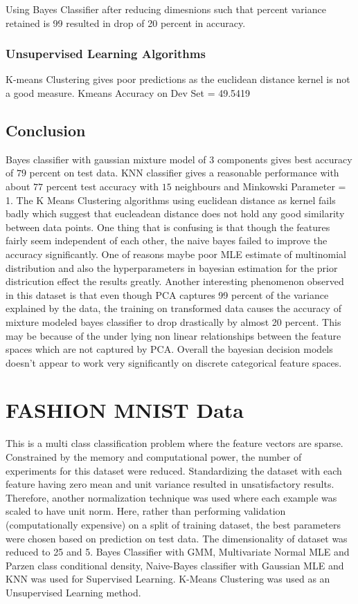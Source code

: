 \documentclass[12pt,journal,compsoc]{IEEEtran}
\begin{document}
\noindent Using Bayes Classifier after reducing dimesnions such that percent variance retained is 99 resulted in drop of 20 percent in accuracy. 

\subsubsection{Unsupervised Learning Algorithms}

\noindent K-means Clustering gives poor predictions as the euclidean distance kernel is not a good measure. Kmeans Accuracy on Dev Set =  49.5419

\pagebreak
\subsection{Conclusion}
\noindent Bayes classifier with gaussian mixture model of 3 components gives best accuracy of  $79$ percent on test data. KNN classifier gives a reasonable performance with about $77$ percent test accuracy with $15$ neighbours and Minkowski Parameter = 1. The K Means Clustering algorithms using euclidean distance as kernel fails badly which suggest that eucleadean distance does not hold any good similarity between data points. One thing that is confusing is that though the features fairly seem independent of each other, the naive bayes failed to improve the accuracy significantly. One of reasons maybe poor MLE estimate of multinomial distribution and also the hyperparameters in bayesian estimation for the prior districution effect the results greatly. Another interesting phenomenon observed in this dataset is that even though PCA captures 99 percent of the variance explained by the data, the training on transformed data causes the accuracy of mixture modeled bayes classifier to drop drastically by almost 20 percent. This may be because of the under lying non linear relationships between the feature spaces which are not captured by PCA. Overall the bayesian decision models doesn’t appear to work very significantly on discrete categorical feature spaces.
\section{FASHION MNIST Data}
\noindent This is a multi class classification problem where the feature vectors are sparse. Constrained by the memory and computational power, the number of experiments for this dataset were reduced. Standardizing the dataset with each feature having zero mean and unit variance resulted in unsatisfactory results. Therefore, another normalization technique was used where each example was scaled to have unit norm. Here, rather than performing validation (computationally expensive) on a split of training dataset, the best parameters were chosen based on prediction on test data. The dimensionality of dataset was reduced to 25 and 5. Bayes Classifier with GMM, Multivariate Normal MLE and Parzen class conditional density, Naive-Bayes classifier with Gaussian MLE and KNN was used for Supervised Learning. K-Means Clustering was used as an Unsupervised Learning method.
\end{document}
